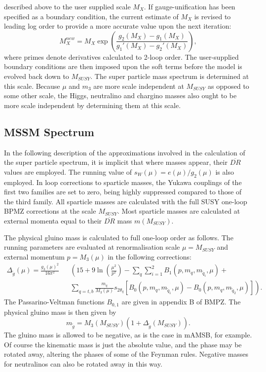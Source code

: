 \documentclass[]{article}
\begin{document}
described above to the user supplied scale $M_X$. 
If gauge-unification has been specified as a boundary condition, the current
estimate of $M_X$ is revised to leading log order 
to provide a more accurate value upon
the next iteration:
\begin{equation}
M_X^{new} = M_X \exp \left({\frac{g_2(M_X) - g_1(M_X)}{g_1'(M_X) - g_2'(M_X)}}\right),
\label{mguteq}
\end{equation}
where primes denote derivatives calculated to 2-loop order.
The user-supplied boundary
conditions are then imposed upon the soft terms before the model is evolved
back down to $M_{SUSY}$. The super particle mass spectrum is determined at this
scale. Because $\mu$ and $m_3$ are 
more scale independent at $M_{SUSY}$ as opposed to some other scale, the Higgs,
neutralino and chargino masses also ought to be more scale independent 
by determining them at this scale. 

\subsection{MSSM Spectrum}

In the following description of the approximations involved in the calculation
of the super particle spectrum, it is implicit that where masses
appear, their $\overline{DR}$ values 
are employed. The running value of
$s_W(\mu)=e(\mu) / g_2(\mu)$ is also employed.
In loop corrections to sparticle masses, the Yukawa couplings of the first two
families are set to zero, being highly suppressed compared to those of the
third family. 
All sparticle masses are calculated with the full SUSY one-loop BPMZ
corrections at the scale $M_{SUSY}$. Most sparticle masses are
calculated at external momenta equal to their $\overline{DR}$ mass
$m(M_{SUSY})$. 

The physical gluino mass is calculated to full one-loop order as follows.
The running parameters are evaluated at renormalisation scale 
$\mu=M_{SUSY}$ and external momentum 
$p=M_3(\mu)$ in the following corrections:
\begin{eqnarray}
\Delta_{\tilde g} (\mu) = \frac{g_3(\mu)^2}{16 \pi^2} &&
\left( 15 + 9 \ln \left( \frac{\mu^2}{p^2} \right) - \sum_q \sum_{i=1}^2
B_1(p, m_q, m_{\tilde q_i}, \mu) + \right. \nonumber \\
&& \left. 
\sum_{q=t,b} \frac{m_q}{M_3(\mu)} s_{2 \theta_q} \left[ B_0(p, m_q, m_{\tilde
q_1}, \mu) - 
B_0(p, m_q, m_{\tilde q_2}, \mu) \right] 
\right).
\end{eqnarray}
The Passarino-Veltman functions $B_{0,1}$ are given in appendix B of BMPZ\@.
The physical gluino mass is then given by
\begin{equation}
m_{\tilde g} = M_3(M_{SUSY}) \left(1 + \Delta_{\tilde g} (M_{SUSY})\right). 
\label{glumass}
\end{equation}
The gluino mass
is allowed to be negative, as is the case in mAMSB, for example. Of course the
kinematic mass is just the absolute value, and the phase may be rotated away,
altering the phases of some of the Feynman rules. Negative masses for
neutralinos can also be rotated away in this way.
\end{document}
